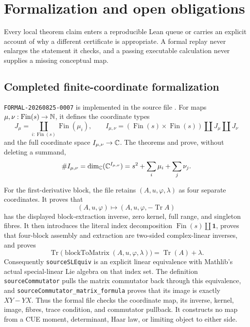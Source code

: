 \section{Formalization and open obligations}

Every local theorem claim enters a reproducible Lean queue or carries an explicit account of
why a different certificate is appropriate.  A formal replay never enlarges the statement it
checks, and a passing executable calculation never supplies a missing conceptual map.

\subsection{Completed finite-coordinate formalization}

\texttt{FORMAL-20260825-0007} is implemented in the source file
.  For maps
$\mu,\nu:\operatorname{Fin}(s)\to\mathbb{N}$, it defines the coordinate types
\[
 J_\mu=\coprod_{i:\operatorname{Fin}(s)}\operatorname{Fin}(\mu_i),\qquad
 I_{\mu,\nu}=(\operatorname{Fin}(s)\times\operatorname{Fin}(s))
 \amalg J_\mu\amalg J_\nu
\]
and the full coordinate space $I_{\mu,\nu}\to\mathbb C$.  The theorems
 and  prove, without deleting a
summand,
\[
 \#I_{\mu,\nu}=\dim_\mathbb C(\mathbb C^{I_{\mu,\nu}})
 =s^2+\sum_i\mu_i+\sum_j\nu_j.
\]

For the first-derivative block, the file retains
$(A,u,\varphi,\lambda)$ as four separate coordinates.  It proves that
\[
 (A,u,\varphi)\longmapsto(A,u,\varphi,-\operatorname{Tr}A)
\]
has the displayed block-extraction inverse, zero kernel, full range, and singleton fibres.
It then introduces the literal index decomposition
$\operatorname{Fin}(s)\amalg\mathbf{1}$, proves that four-block assembly and extraction are
two-sided complex-linear inverses, and proves
\[
 \operatorname{Tr}\bigl(\operatorname{blockToMatrix}(A,u,\varphi,\lambda)\bigr)
 =\operatorname{Tr}(A)+\lambda.
\]
Consequently \texttt{sourceSLEquiv} is an explicit linear equivalence with Mathlib's actual
special-linear Lie algebra on that index set.  The definition \texttt{sourceCommutator} pulls
the matrix commutator back through this equivalence, and
\texttt{sourceCommutator\_matrix\_formula} proves that its image is exactly
$XY-YX$.  Thus the formal file checks the coordinate map, its inverse, kernel, image, fibres,
trace condition, and commutator pullback.  It constructs no map from a CUE moment, determinant,
Haar law, or limiting object to either side.

